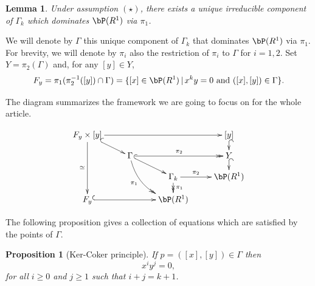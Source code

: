 \documentclass[a4paper,11pt]{amsart}
\newtheorem{lemma}[theorem]{Lemma}
\newtheorem{proposition}[theorem]{Proposition}
\begin{document}
\begin{lemma}
\label{LEM:UniqueGamma}
Under assumption $(\star)$, there exists a unique irreducible component of $\Gamma_k$ which dominates $\bP(R^1)$ via $\pi_1$.
\end{lemma}

We will denote by $\Gamma$ this unique component of $\Gamma_k$ that dominates $\bP(R^1)$ via $\pi_1$. For brevity, we will denote by $\pi_i$ also the restriction of $\pi_i$ to $\Gamma$ for $i=1,2$. Set $Y=\pi_2(\Gamma)$ and, for any $[y]\in Y$, 
$$F_y=\pi_1(\pi_2^{-1}([y])\cap \Gamma)=\{[x]\in \bP(R^1)\,|\, x^ky=0 \mbox{ and } ([x],[y])\in \Gamma\}.$$

The diagram summarizes the framework we are going to focus on for the whole article.

$$
\xymatrix@R=10pt{
F_y\times [y] \ar[ddd]_{\simeq} \ar@{^{(}->}[rd] \ar[rrr] & & & [y] \ar@{^{(}->}[d] \\ 
& \Gamma \ar@/_1.0pc/@{->>}[ddr]_-{\pi_1}  \ar@{->>}[rr]^-{\pi_2} \ar@{^{(}->}[rd]  & & Y \ar@{^{(}->}[d] \\
& & \Gamma_{k} \ar[r]^-{\pi_2} \ar@{->>}[d]^-{\pi_1} & \bP(R^1) \\
F_y \ar@{^{(}->}[rr] & & \bP(R^1)
}
$$



The following proposition gives a collection of equations which are satisfied by the points of $\Gamma$.

\begin{proposition} [Ker-Coker principle]
\label{PROP:CONE}
If $p=([x],[y])\in \Gamma$ then $$x^iy^j=0,$$ for all $i\geq 0$ and $j\geq 1$ such that $i+j=k+1$. 
\end{proposition}
\end{document}

